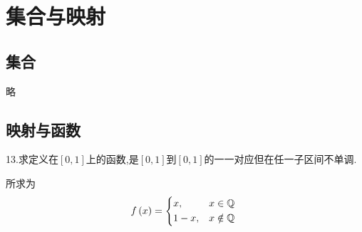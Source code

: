 \newpage
\chapter{集合与映射}
\section{集合}
略
\section{映射与函数}
13.求定义在$\left[0,1\right]$上的函数,是$\left[0,1\right]$到$\left[0,1\right]$的一一对应但在任一子区间不单调.
\begin{solution}
所求为\[
f\left(x\right)=\begin{cases*}
    x,&$x\in\mathbb{Q}$\\
    1-x,&$x\notin\mathbb{Q}$
\end{cases*}
\]
\end{solution}
